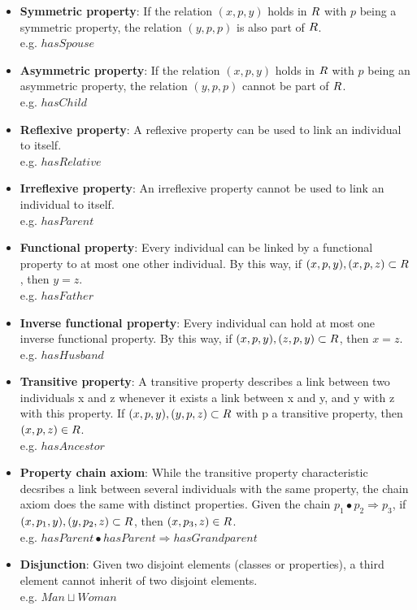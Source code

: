 \begin{itemize}
	\item \textbf{Symmetric property}: If the relation $(x, p, y)$ holds in $R$ with $p$ being a symmetric property, the relation $(y, p, p)$ is also part of $R$. \\ e.g. $hasSpouse$
	
	\item \textbf{Asymmetric property}: If the relation $(x, p, y)$ holds in $R$ with $p$ being an asymmetric property, the relation $(y, p, p)$ cannot be part of $R$. \\ e.g. $hasChild$
	
	\item \textbf{Reflexive property}: A reflexive property can be used to link an individual to itself. \\ e.g. $hasRelative$
	
	\item \textbf{Irreflexive property}: An irreflexive property cannot be used to link an individual to itself. \\ e.g. $hasParent$
	
	\item \textbf{Functional property}: Every individual can be linked by a functional property to at most one other individual. By this way, if ${(x, p, y), (x, p, z)} \subset R$, then $y = z$. \\ e.g. $hasFather$
	
	\item \textbf{Inverse functional property}: Every individual can hold at most one inverse functional property. By this way, if ${(x, p, y), (z, p, y)} \subset R$, then $x = z$. \\ e.g. $hasHusband$
	
	\item \textbf{Transitive property}: A transitive property describes a link between two individuals x and z whenever it exists a link between x and y, and y with z with this property. If ${(x, p, y), (y, p, z)} \subset R$ with p a transitive property, then $(x, p, z) \in R$. \\ e.g. $hasAncestor$
	
	\item \textbf{Property chain axiom}: While the transitive property characteristic decsribes a link between several individuals with the same property, the chain axiom does the same with distinct properties. Given the chain $p_1 \bullet p_2 \Rightarrow p_3$, if ${(x, p_1, y), (y, p_2, z)} \subset R$, then $(x, p_3, z) \in R$. \\ e.g. $hasParent \bullet hasParent \Rightarrow hasGrandparent$
	
	\item \textbf{Disjunction}: Given two disjoint elements (classes or properties), a third element cannot inherit of two disjoint elements. \\ e.g. $Man \sqcup Woman$
\end{itemize}

